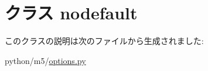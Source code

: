 \hypertarget{classm5_1_1options_1_1nodefault}{
\section{クラス nodefault}
\label{classm5_1_1options_1_1nodefault}
}


このクラスの説明は次のファイルから生成されました:\begin{DoxyCompactItemize}
\item 
python/m5/\hyperlink{options_8py}{options.py}\end{DoxyCompactItemize}
